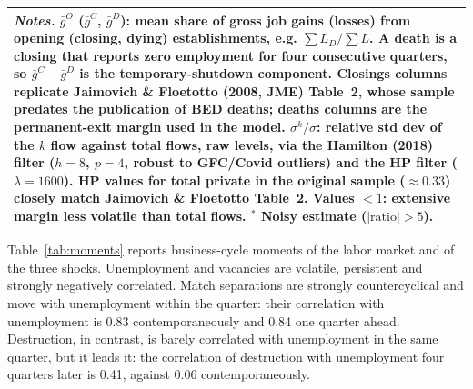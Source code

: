 \documentclass[authoryear, review, 12pt]{elsarticle}
\begin{document}
\begin{table}[H]
\begin{tabular}{lccccccccc}
\multicolumn{10}{p{0.98\linewidth}}{\footnotesize \textit{Notes.} $\bar{g}^O$ ($\bar{g}^C$, $\bar{g}^D$): mean share of gross job gains (losses) from opening (closing, dying) establishments, e.g. $\sum L_D/\sum L$. A death is a closing that reports zero employment for four consecutive quarters, so $\bar{g}^C-\bar{g}^D$ is the temporary-shutdown component. Closings columns replicate Jaimovich \& Floetotto (2008, JME) Table~2, whose sample predates the publication of BED deaths; deaths columns are the permanent-exit margin used in the model. $\sigma^k/\sigma$: relative std dev of the $k$ flow against total flows, raw levels, via the Hamilton (2018) filter ($h{=}8$, $p{=}4$, robust to GFC/Covid outliers) and the HP filter ($\lambda{=}1600$). HP values for total private in the original sample ($\approx 0.33$) closely match Jaimovich \& Floetotto Table~2. Values $<1$: extensive margin less volatile than total flows. $^{*}$ Noisy estimate ($|\text{ratio}|>5$).} \\
\bottomrule
\end{tabular}
\end{table}

Table~\ref{tab:moments} reports business-cycle moments of the labor market and of the three shocks. Unemployment and vacancies are volatile, persistent and strongly negatively correlated. Match separations are strongly countercyclical and move with unemployment within the quarter: their correlation with unemployment is 0.83 contemporaneously and 0.84 one quarter ahead. Destruction, in contrast, is barely correlated with unemployment in the same quarter, but it leads it: the correlation of destruction with unemployment four quarters later is 0.41, against 0.06 contemporaneously.
\end{document}
